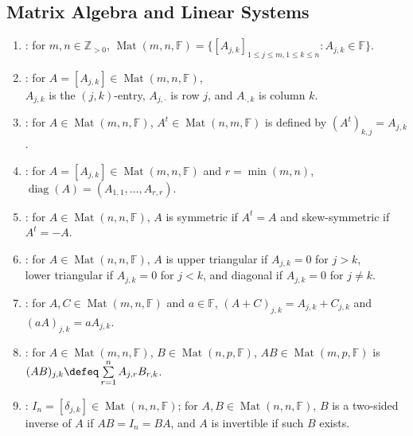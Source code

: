 \subsection{Matrix Algebra and Linear Systems}
\begin{definition} \label{def:matrices-and-matrix-operations} 
\begin{enumerate}[label=(\roman*)]
\setlength{\itemsep}{0pt}
\item {}: for $m,n\in\mathbb{Z}_{>0}$, $\operatorname{Mat}(m,n,\mathbb{F})=\{[A_{j,k}]_{1\leq j\leq m,1\leq k\leq n}:A_{j,k}\in\mathbb{F}\}$.
\item {}: for $A=[A_{j,k}]\in\operatorname{Mat}(m,n,\mathbb{F})$,\\
$A_{j,k}$ is the $(j,k)$-entry, $A_{j,\cdot}$ is row $j$, and $A_{\cdot,k}$ is column $k$.
\item {}: for $A\in\operatorname{Mat}(m,n,\mathbb{F})$, $A^t\in\operatorname{Mat}(n,m,\mathbb{F})$ is defined by $(A^t)_{k,j}=A_{j,k}$.
\item {}: for $A=[A_{j,k}]\in\operatorname{Mat}(m,n,\mathbb{F})$ and $r=\min(m,n)$, $\operatorname{diag}(A)=(A_{1,1},\ldots,A_{r,r})$.
\item {}: for $A\in\operatorname{Mat}(n,n,\mathbb{F})$, $A$ is symmetric if $A^t=A$ and skew-symmetric if $A^t=-A$.
\item {}: for $A\in\operatorname{Mat}(n,n,\mathbb{F})$, $A$ is upper triangular if $A_{j,k}=0$ for $j>k$,\\
lower triangular if $A_{j,k}=0$ for $j<k$, and diagonal if $A_{j,k}=0$ for $j\neq k$.
\item {}: for $A,C\in\operatorname{Mat}(m,n,\mathbb{F})$ and $a\in\mathbb{F}$, $(A+C)_{j,k}=A_{j,k}+C_{j,k}$ and $(aA)_{j,k}=aA_{j,k}$.
\item {}: for $A\in\operatorname{Mat}(m,n,\mathbb{F})$, $B\in\operatorname{Mat}(n,p,\mathbb{F})$, $AB\in\operatorname{Mat}(m,p,\mathbb{F})$ is $(AB)_{j,k}\defeq\sum\limits_{r=1}^{n}A_{j,r}B_{r,k}$.
\item {}: $I_n=[\delta_{j,k}]\in\operatorname{Mat}(n,n,\mathbb{F})$; for $A,B\in\operatorname{Mat}(n,n,\mathbb{F})$, $B$ is a two-sided inverse of $A$ if $AB=I_n=BA$, and $A$ is invertible if such $B$ exists.
\end{enumerate}
\end{definition}

